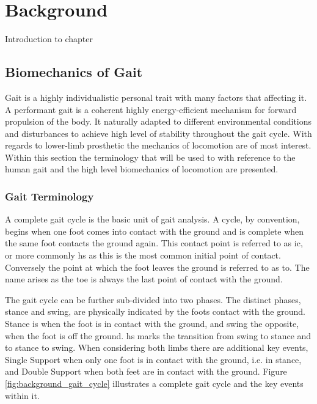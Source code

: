 \chapter{Background}
\label{chp:background}
Introduction to chapter

\section{Biomechanics of Gait}
Gait is a highly individualistic personal trait with many factors that affecting it\cite{Horst2019}. A performant gait is a coherent highly energy-efficient mechanism for forward propulsion of the body. It naturally adapted to different environmental conditions and disturbances to achieve high level of stability throughout the gait cycle\cite{Shah2020, Mummolo2013}. With regards to lower-limb prosthetic the mechanics of locomotion are of most interest. Within this section the terminology that will be used to with reference to the human gait and the high level biomechanics of locomotion are presented.

\subsection{Gait Terminology}
A complete gait cycle is the basic unit of gait analysis. A cycle, by convention, begins when one foot comes into contact with the ground and is complete when the same foot contacts the ground again. This contact point is referred to as \acrfull{ic}, or more commonly \acrfull{hs} as this is the most common initial point of contact. Conversely the point at which the foot leaves the ground is referred to as \acrfull{to}. The name arises as the toe is always the last point of contact with the ground.\cite{Novacheck1998, Shah2020}

The gait cycle can be further sub-divided into two phases. The distinct phases, stance and swing, are physically indicated by the foots contact with the ground. Stance is when the foot is in contact with the ground, and swing the opposite, when the foot is off the ground. \acrshort{hs} marks the transition from swing to stance and \acrshort{to} stance to swing. When considering both limbs there are additional key events, Single Support when only one foot is in contact with the ground, i.e. in stance, and Double Support when both feet are in contact with the ground. Figure \ref{fig:background_gait_cycle} illustrates a complete gait cycle and the key events within it.\cite{Novacheck1998, Shah2020}

